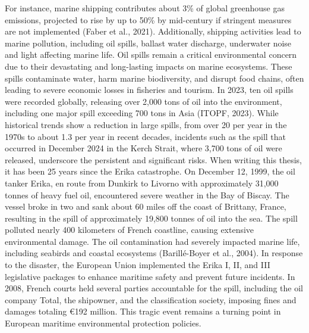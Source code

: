 \documentclass[
  letterpaper,
  11pt,
  english,
  singlespacing,
  headsepline]{MastersDoctoralThesis}
\begin{document}
\begin{spacing}{1.5}
For instance, marine shipping contributes about 3\% of global greenhouse
gas emissions, projected to rise by up to 50\% by mid-century if
stringent measures are not implemented (Faber et al., 2021).
Additionally, shipping activities lead to marine pollution, including
oil spills, ballast water discharge, underwater noise and light
affecting marine life. Oil spills remain a critical environmental
concern due to their devastating and long-lasting impacts on marine
ecosystems. These spills contaminate water, harm marine biodiversity,
and disrupt food chains, often leading to severe economic losses in
fisheries and tourism. In 2023, ten oil spills were recorded globally,
releasing over 2,000 tons of oil into the environment, including one
major spill exceeding 700 tons in Asia (ITOPF, 2023). While historical
trends show a reduction in large spills, from over 20 per year in the
1970s to about 1.3 per year in recent decades, incidents such as the
spill that occurred in December 2024 in the Kerch Strait, where 3,700
tons of oil were released, underscore the persistent and significant
risks. When writing this thesis, it has been 25 years since the Erika
catastrophe. On December 12, 1999, the oil tanker Erika, en route from
Dunkirk to Livorno with approximately 31,000 tonnes of heavy fuel oil,
encountered severe weather in the Bay of Biscay. The vessel broke in two
and sank about 60 miles off the coast of Brittany, France, resulting in
the spill of approximately 19,800 tonnes of oil into the sea. The spill
polluted nearly 400 kilometers of French coastline, causing extensive
environmental damage. The oil contamination had severely impacted marine
life, including seabirds and coastal ecosystems (Barillé-Boyer et al.,
2004). In response to the disaster, the European Union implemented the
Erika I, II, and III legislative packages to enhance maritime safety and
prevent future incidents. In 2008, French courts held several parties
accountable for the spill, including the oil company Total, the
shipowner, and the classification society, imposing fines and damages
totaling €192 million. This tragic event remains a turning point in
European maritime environmental protection policies.


\end{spacing}
\end{document}
